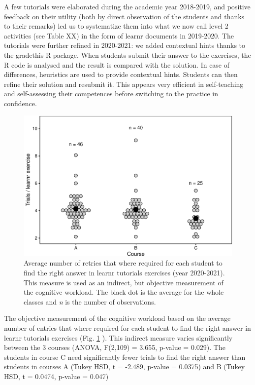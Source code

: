 \documentclass[
]{article}
\begin{document}
A few tutorials were elaborated during the academic year 2018-2019, and
positive feedback on their utility (both by direct observation of the
students and thanks to their remarks) led us to systematize them into
what we now call level 2 activities (see Table XX) in the form of learnr
documents in 2019-2020. The tutorials were further refined in 2020-2021:
we added contextual hints thanks to the gradethis R package. When
students submit their answer to the exercises, the R code is analysed
and the result is compared with the solution. In case of differences,
heuristics are used to provide contextual hints. Students can then
refine their solution and resubmit it. This appears very efficient in
self-teaching and self-assessing their competences before switching to
the practice in confidence.

\begin{figure}
\centering
\includegraphics{teaching_data_science_files/figure-latex/fig_learn_trials-1.pdf}
\caption{\label{fig:fig_learn_trials} Average number of retries that
where required for each student to find the right answer in learnr
tutorials exercises (year 2020-2021). This measure is used as an
indirect, but objective measurement of the cognitive workload. The black
dot is the average for the whole classes and \emph{n} is the number of
observations.}
\end{figure}

The objective measurement of the cognitive workload based on the average
number of entries that where required for each student to find the right
answer in learnr tutorials exercises (Fig. \ref{fig:fig_learn_trials} ).
This indirect measure varies significantly between the 3 courses (ANOVA,
F(2,109) = 3.655, p-value = 0.029). The students in course C need
significantly fewer trials to find the right answer than students in
courses A (Tukey HSD, t = -2.489, p-value = 0.0375) and B (Tukey HSD, t
= 0.0474, p-value = 0.047)
\end{document}
